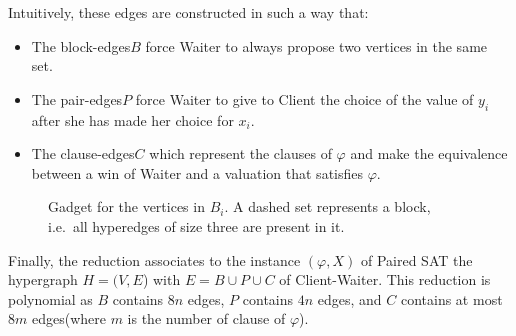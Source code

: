 \documentclass{article}
\def\rotateclockwise#1{
\newdimen\xrw
  \pgfextractx{\xrw}{#1}
  \newdimen\yrw
  \pgfextracty{\yrw}{#1}
\pgfpoint{\yrw}{-\xrw}
}
\def\rotatecounterclockwise#1{
\newdimen\xrcw
  \pgfextractx{\xrcw}{#1}
  \newdimen\yrcw
  \pgfextracty{\yrcw}{#1}
\pgfpoint{-\yrcw}{\xrcw}
}
\def\outsidespacerpgfclockwise#1#2#3{
\pgfpointscale{#3}{
    \rotateclockwise{
      \pgfpointnormalised{
        \pgfpointdiff{#1}{#2}}}}
}
\def\outsidespacerpgfcounterclockwise#1#2#3{
\pgfpointscale{#3}{
    \rotatecounterclockwise{
      \pgfpointnormalised{
        \pgfpointdiff{#1}{#2}}}}
}
\def\outsidepgfclockwise#1#2#3{
\pgfpointadd{#2}{\outsidespacerpgfclockwise{#1}{#2}{#3}}
}
\def\outsidepgfcounterclockwise#1#2#3{
\pgfpointadd{#2}{\outsidespacerpgfcounterclockwise{#1}{#2}{#3}}
}
\def\outside#1#2#3{
  ($ (#2) ! #3 ! -90 : (#1) $)
}
\def\cornerpgf#1#2#3#4{
\pgfextra{
    \pgfmathanglebetweenpoints{#2}{\outsidepgfcounterclockwise{#1}{#2}{#4}}
    \let\anglea\pgfmathresult
    \let\startangle\pgfmathresult

    \pgfmathanglebetweenpoints{#2}{\outsidepgfclockwise{#3}{#2}{#4}}
    \pgfmathparse{\pgfmathresult - \anglea}
    \pgfmathroundto{\pgfmathresult}
    \let\arcangle\pgfmathresult
    \ifthenelse{180=\arcangle \or 180<\arcangle}{
      \pgfmathparse{-360 + \arcangle}}{
      \pgfmathparse{\arcangle}}
    \let\deltaangle\pgfmathresult

    \newdimen\x
    \pgfextractx{\x}{\outsidepgfcounterclockwise{#1}{#2}{#4}}
    \newdimen\y
    \pgfextracty{\y}{\outsidepgfcounterclockwise{#1}{#2}{#4}}
  }
  -- (\x,\y) arc [start angle=\startangle, delta angle=\deltaangle, radius=#4]
}
\def\corner#1#2#3#4{
  \cornerpgf{\pgfpointanchor{#1}{center}}{\pgfpointanchor{#2}{center}}{\pgfpointanchor{#3}{center}}{#4}
}
\def\hedgeiii#1#2#3#4{
\outside{#1}{#2}{#4} \corner{#1}{#2}{#3}{#4} \corner{#2}{#3}{#1}{#4} \corner{#3}{#1}{#2}{#4} -- cycle
}
\def\hedgeiiii#1#2#3#4#5{
\outside{#1}{#2}{#5} \corner{#1}{#2}{#3}{#5} \corner{#2}{#3}{#4}{#5} \corner{#3}{#4}{#1}{#5} \corner{#4}{#1}{#2}{#5} -- cycle
}
\newcommand{\hyp}{H}
\newcommand{\WS}{E}
\newcommand{\som}{V}
\newcommand{\hedges}{edges\xspace}
\begin{document}
Intuitively, these \hedges are constructed in such a way that:
\begin{itemize}
    \item The block-\hedges $B$ force Waiter to always propose two vertices in the same set. \item The pair-\hedges $P$ force Waiter to give to Client the choice of the value of $y_i$ after she has made her choice for $x_i$.
    \item The clause-\hedges $C$ which represent the clauses of $\varphi$ and make the equivalence between a win of Waiter and a valuation that satisfies $\varphi$.
\end{itemize}

\begin{figure}
    \centering







    \caption{Gadget for the vertices in $B_i$. A dashed set represents a block, i.e.\ all hyperedges of size three are present in it.}
    \label{fig: gadget client waiter}
\end{figure} 




Finally, the reduction associates to the instance $(\varphi,X)$ of {\sc Paired SAT} the hypergraph $\hyp = (\som, \WS$) with $\WS = B \cup P \cup C$ of Client-Waiter. This reduction is polynomial as $B$ contains $8n$ \hedges, $P$ contains $4n$ \hedges, and $C$ contains at most $8m$ \hedges (where $m$ is the number of clause of $\varphi$).
\end{document}
